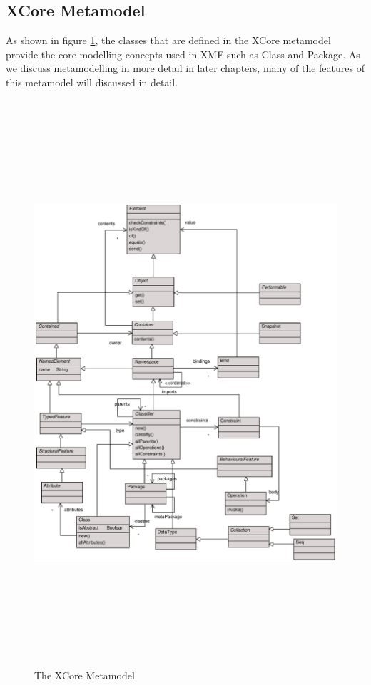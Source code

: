\subsection{XCore Metamodel}

As shown in figure \ref{coreMetamodel}, the classes that are
defined in the XCore metamodel provide the core modelling concepts
used in XMF such as Class and Package. As we discuss metamodelling
in more detail in later chapters, many of the features of this
metamodel will discussed in detail.

\begin{figure}[htb]
\begin{center}
\includegraphics[height=21cm]{XMF/figures/xcore.pdf}
\caption{The XCore Metamodel} \label{coreMetamodel}
\end{center}
\end{figure}


